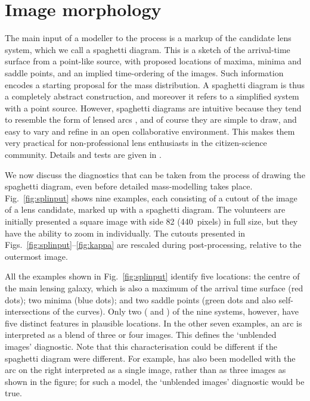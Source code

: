 
\section{Image morphology}
\label{sec:morph}

The main input of a modeller to the process is a markup of the
candidate lens system, which we call a spaghetti diagram.  This is a
sketch of the arrival-time surface from a point-like source, with
proposed locations of maxima, minima and saddle points, and an implied
time-ordering of the images.  Such information encodes a starting
proposal for the mass distribution.  A spaghetti diagram is thus a
completely abstract construction, and moreover it refers to a
simplified system with a point source.  However, spaghetti diagrams
are intuitive because they tend to resemble the form of lensed arcs
\citep[see Fig.~3 of][]{2008MNRAS.383..857F}, and of course they are
simple to draw, and easy to vary and refine in an open collaborative
environment. This makes them very practical for non-professional lens
enthusiasts in the citizen-science community.  Details and tests are
given in \citet{2015MNRAS.447.2170K}.

We now discuss the diagnostics that can be taken from the process of
drawing the spaghetti diagram, even before detailed mass-modelling
takes place.  Fig.~\ref{fig:splinput} shows nine examples, each
consisting of a cutout of the \SW  image of a lens candidate,
marked up with a spaghetti diagram.
The volunteers are initially presented a square image with side
\SI{82}{\arcsec} (\SI{440}{pixels}) in full size, but they have the
ability to zoom in individually.
The cutouts presented in Figs.~\ref{fig:splinput}--\ref{fig:kappa}
are rescaled during post-processing, relative to the outermost image.

All the examples shown in Fig.~\ref{fig:splinput} identify five locations:
the centre of the main lensing galaxy, which is also a maximum of the
arrival time surface (red dots); two minima (blue dots); and two
saddle points (green dots and also self-intersections of the curves).
Only two ( and ) of the nine systems, however, have five
distinct features in plausible locations.  In the other seven
examples, an arc is interpreted as a blend of three or four images.
This defines the `unblended images' diagnostic.  Note that this
characterisation could be different if the spaghetti diagram were 
different.  For example,  has also been modelled with the arc on
the right interpreted as a single image, rather than as three images
as shown in the figure; for such a model, the `unblended images'
diagnostic would be true.

